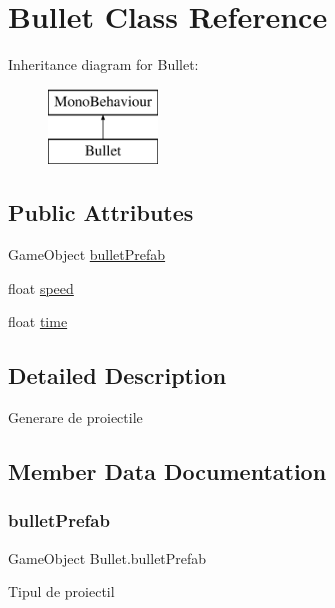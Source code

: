\hypertarget{class_bullet}{}\section{Bullet Class Reference}
\label{class_bullet}
Inheritance diagram for Bullet\+:\begin{figure}[H]
\begin{center}
\leavevmode
\includegraphics[height=2.000000cm]{class_bullet}
\end{center}
\end{figure}
\subsection*{Public Attributes}
\begin{DoxyCompactItemize}
\item 
Game\+Object \hyperlink{class_bullet_ace755c0a98317cf6aefa1d69949081cf}{bullet\+Prefab}
\item 
float \hyperlink{class_bullet_a75e914c39a4154ced3d653ae44a05539}{speed}
\item 
float \hyperlink{class_bullet_ae35c2a21d9d6abff09869e1a9f3b2053}{time}
\end{DoxyCompactItemize}


\subsection{Detailed Description}
Generare de proiectile 

\subsection{Member Data Documentation}
\mbox{\label{class_bullet_ace755c0a98317cf6aefa1d69949081cf}} 
\subsubsection{\texorpdfstring{bullet\+Prefab}{bulletPrefab}}
{\footnotesize\ttfamily Game\+Object Bullet.\+bullet\+Prefab}

Tipul de proiectil \mbox{\label{class_bullet_a75e914c39a4154ced3d653ae44a05539}} 
